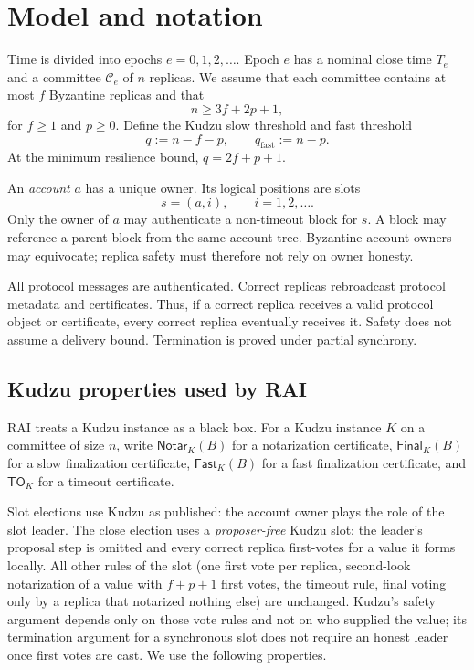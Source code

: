 \documentclass[11pt]{article}
\theoremstyle{remark}
\newcommand{\C}{\mathcal{C}}
\newcommand{\Notar}{\mathsf{Notar}}
\newcommand{\Final}{\mathsf{Final}}
\newcommand{\Fast}{\mathsf{Fast}}
\newcommand{\TO}{\mathsf{TO}}
\begin{document}
\section{Model and notation}

Time is divided into epochs $e=0,1,2,\ldots$. Epoch $e$ has a nominal close time $T_e$ and a committee $\C_e$ of $n$ replicas. We assume that each committee contains at most $f$ Byzantine replicas and that
\begin{equation}
  n \ge 3f+2p+1,
  \label{eq:kudzu-resilience}
\end{equation}
for $f\ge 1$ and $p\ge 0$. Define the Kudzu slow threshold and fast threshold
\begin{equation}
  q := n-f-p,
  \qquad
  q_{\mathrm{fast}} := n-p.
  \label{eq:thresholds}
\end{equation}
At the minimum resilience bound, $q=2f+p+1$.

An \emph{account} $a$ has a unique owner. Its logical positions are slots
\[
  s=(a,i), \qquad i=1,2,\ldots .
\]
Only the owner of $a$ may authenticate a non-timeout block for $s$. A block may reference a parent block from the same account tree. Byzantine account owners may equivocate; replica safety must therefore not rely on owner honesty.

All protocol messages are authenticated. Correct replicas rebroadcast protocol metadata and certificates. Thus, if a correct replica receives a valid protocol object or certificate, every correct replica eventually receives it. Safety does not assume a delivery bound. Termination is proved under partial synchrony.

\subsection{Kudzu properties used by RAI}

RAI treats a Kudzu instance as a black box. For a Kudzu instance $K$ on a committee of size $n$, write $\Notar_K(B)$ for a notarization certificate, $\Final_K(B)$ for a slow finalization certificate, $\Fast_K(B)$ for a fast finalization certificate, and $\TO_K$ for a timeout certificate.

Slot elections use Kudzu as published: the account owner plays the role of the slot leader. The close election uses a \emph{proposer-free} Kudzu slot: the leader's proposal step is omitted and every correct replica first-votes for a value it forms locally. All other rules of the slot (one first vote per replica, second-look notarization of a value with $f+p+1$ first votes, the timeout rule, final voting only by a replica that notarized nothing else) are unchanged. Kudzu's safety argument depends only on those vote rules and not on who supplied the value; its termination argument for a synchronous slot does not require an honest leader once first votes are cast. We use the following properties.
\end{document}

